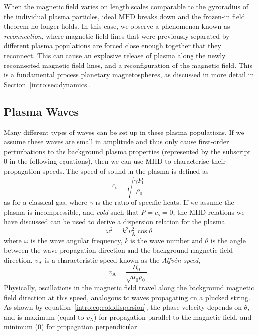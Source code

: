 When the magnetic field varies on length scales comparable to the gyroradius of the individual plasma particles, ideal MHD breaks down and the frozen-in field theorem no longer holds. In this case, we observe a phenomenon known as \textit{reconnection}, where magnetic field lines that were previously separated by different plasma populations are forced close enough together that they reconnect. This can cause an explosive release of plasma along the newly reconnected magnetic field lines, and a reconfiguration of the magnetic field. This is a fundamental process planetary magnetospheres, as discussed in more detail in Section~\ref{intro:sec:dynamics}. 

\subsection{Plasma Waves}
Many different types of waves can be set up in these plasma populations. If we assume these waves are small in amplitude and thus only cause first-order perturbations to the background plasma properties (represented by the subscript 0 in the following equations), then we can use MHD to characterise their propagation speeds. The speed of sound in the plasma is defined as
\begin{equation}
c_\mathrm{s} = \sqrt{\frac{\gamma P_0}{\rho_0}}
\end{equation}
as for a classical gas, where $\gamma$ is the ratio of specific heats. If we assume the plasma is incompressible, and \textit{cold} such that $P = c_\mathrm{s} = 0$, the MHD relations we have discussed can be used to derive a dispersion relation for the plasma
\begin{equation}\label{intro:eq:colddispersion}
\omega^2 = k^2{v}_\mathrm{A}^2\cos{\theta}
\end{equation}
where $\omega$ is the wave angular frequency, $k$ is the wave number and $\theta$ is the angle between the wave propagation direction and the background magnetic field direction. $v_\mathrm{A}$ is a characteristic speed known as the \textit{Alfv\'en speed},
\begin{equation}
v_\mathrm{A} = \frac{B_0}{\sqrt{\mu_0\rho_0}}.
\end{equation}
Physically, oscillations in the magnetic field travel along the background magnetic field direction at this speed, analogous to waves propagating on a plucked string. As shown by equation~\ref{intro:eq:colddispersion}, the phase velocity depends on $\theta$, and is maximum (equal to $v_\mathrm{A}$) for propagation parallel to the magnetic field, and minimum (0) for propagation perpendicular. 

